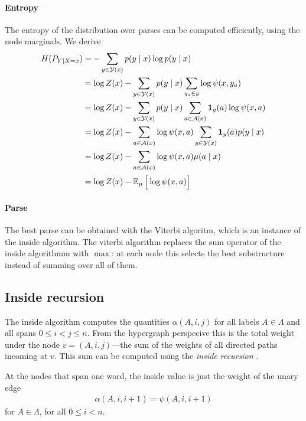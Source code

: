 \paragraph{Entropy}
The entropy of the distribution over parses can be computed efficiently, using the node marginals. We derive
\begin{align*}
  H(P_{Y \vert X = x})
    &= - \sum_{ y \in \mathcal{Y}(x) } p(y \mid x) \log p(y \mid x)  \\
    &= \log Z(x) - \sum_{ y \in \mathcal{Y}(x) } p(y \mid x) \sum_{y_a \in y} \log \psi(x, y_a)  \\
    &= \log Z(x) - \sum_{ y \in \mathcal{Y}(x) } p(y \mid x) \sum_{ a \in \mathcal{A}(x) } \operatorname{\mathbf{1}}_{y}(a) \log \psi(x, a)  \\
    &= \log Z(x) - \sum_{ a \in \mathcal{A}(x) } \log \psi(x, a)  \sum_{ y \in \mathcal{Y}(x) } \operatorname{\mathbf{1}}_{y}(a) p(y \mid x)  \\
    &= \log Z(x) - \sum_{ a \in \mathcal{A}(x) } \log \psi(x, a)  \mu(a \mid x)  \\
    &=  \log Z(x) - \operatorname{\mathbb{E}}_{ \mu } \Big[ \log \psi(x, a) \Big]  \\
\end{align*}

\paragraph{Parse}
The best parse can be obtained with the Viterbi algoritm, which is an instance of the inside algorithm. The viterbi algorithm replaces the sum operator of the inside algorithmm with $\max$: at each node this selects the best substructure instead of summing over all of them.

\subsection{Inside recursion}
  The inside algorithm computes the quantities $\alpha(A,i,j)$ for all labels $A \in \Lambda$ and all spans $0 \leq i < j \leq n$. From the hypergraph perspecive this is the total weight under the node $v = (A, i, j)$---the sum of the weights of all directed paths incoming at $v$. This sum can be computed using the \textit{inside recursion} \citep{goodman1999semiring}.

  At the nodes that span one word, the inside value is just the weight of the unary edge
  \begin{align}
      \label{eq:inside-base}
      \alpha(A, i, i+1) = \psi(A, i, i+1)
  \end{align}
  for $A \in \Lambda$, for all $0 \leq i < n$.

